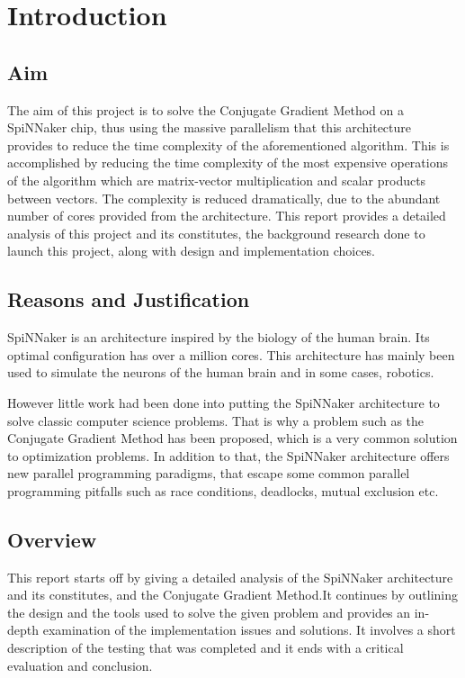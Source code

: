 \documentclass[12pt,a4paper]{article}
\begin{document}
\section{Introduction}
\subsection{Aim}
The aim of this project is to solve the Conjugate Gradient Method\cite{hestenes1952methods} on a SpiNNaker chip, thus using the massive parallelism that this architecture provides to reduce the time complexity of the aforementioned algorithm. This is accomplished by reducing the time complexity of the most expensive operations of the algorithm which are matrix-vector multiplication and scalar products between vectors. The complexity is reduced dramatically, due to the abundant number of cores provided from the architecture. This report provides a detailed analysis of this project and its constitutes, the background research done to launch this project, along with design and implementation choices.
\subsection{Reasons and Justification}
\indent
SpiNNaker is an architecture inspired by the biology of the human brain. Its optimal configuration has over a million cores\cite{navaridas2009understanding}. This architecture has mainly been used to simulate the neurons of the human brain and in some cases, robotics.

However little work had been done into putting the SpiNNaker architecture to solve classic computer science problems. That is why a problem such as the Conjugate Gradient Method has been proposed, which is a very common solution to optimization problems. In addition to that, the SpiNNaker architecture offers new parallel programming paradigms, that escape some common parallel programming pitfalls such as race conditions, deadlocks, mutual exclusion etc\cite{sharp2011event}.
\subsection{Overview}
This report starts off by giving a detailed analysis of the SpiNNaker architecture and its constitutes, and the Conjugate Gradient Method.It continues by outlining the design and the tools used to solve the given problem and provides an in-depth examination of the implementation issues and solutions. It involves a short description of the testing that was completed and it ends with a critical evaluation and conclusion.
\newpage
\end{document}

